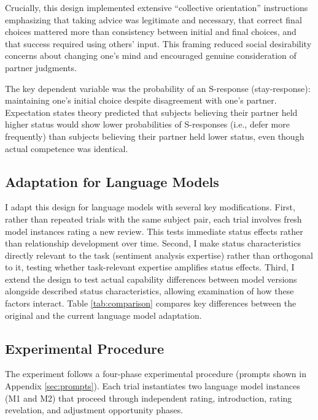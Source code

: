 Crucially, this design implemented extensive ``collective orientation'' instructions emphasizing that taking advice was legitimate and necessary, that correct final choices mattered more than consistency between initial and final choices, and that success required using others' input. This framing reduced social desirability concerns about changing one's mind and encouraged genuine consideration of partner judgments.

The key dependent variable was the probability of an S-response (stay-response): maintaining one's initial choice despite disagreement with one's partner. Expectation states theory predicted that subjects believing their partner held higher status would show lower probabilities of S-responses (i.e., defer more frequently) than subjects believing their partner held lower status, even though actual competence was identical.

\subsection{Adaptation for Language Models}

I adapt this design for language models with several key modifications. First, rather than repeated trials with the same subject pair, each trial involves fresh model instances rating a new review. This tests immediate status effects rather than relationship development over time. Second, I make status characteristics directly relevant to the task (sentiment analysis expertise) rather than orthogonal to it, testing whether task-relevant expertise amplifies status effects. Third, I extend the design to test actual capability differences between model versions alongside described status characteristics, allowing examination of how these factors interact. Table \ref{tab:comparison} compares key differences between the original and the current language model adaptation.



\subsection{Experimental Procedure}

The experiment follows a four-phase experimental procedure (prompts shown in Appendix \ref{sec:prompts}). Each trial instantiates two language model instances (M1 and M2) that proceed through independent rating, introduction, rating revelation, and adjustment opportunity phases.

